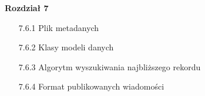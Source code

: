 \documentclass[12pt]{przejsciowka}
\begin{document}
    \vspace{10pt}
    \noindent\textbf{Rozdział 7}
    \begin{itemize}
        \setlength\itemsep{-0.5em}
        \item[7.6.1] Plik metadanych \dotfill \pageref{lst:plik_metadanych}
        \item[7.6.2] Klasy modeli danych \dotfill \pageref{lst:klasy_modeli_danych}
        \item[7.6.3] Algorytm wyszukiwania najbliższego rekordu \dotfill \pageref{lst:algorytm_wyszukiwania_rekordu}
        \item[7.6.4] Format publikowanych wiadomości \dotfill \pageref{lst:format_publikowanych_wiadomosci}
    \end{itemize}
    \endgroup
    \clearpage

    
\end{document}
